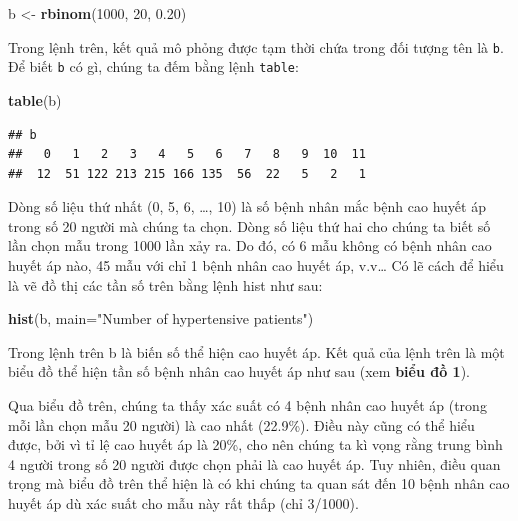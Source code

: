 \documentclass[
]{book}
\newenvironment{Shaded}{\begin{snugshade}}{\end{snugshade}}
\newcommand{\DataTypeTok}[1]{\textcolor[rgb]{0.13,0.29,0.53}{#1}}
\newcommand{\DecValTok}[1]{\textcolor[rgb]{0.00,0.00,0.81}{#1}}
\newcommand{\FloatTok}[1]{\textcolor[rgb]{0.00,0.00,0.81}{#1}}
\newcommand{\KeywordTok}[1]{\textcolor[rgb]{0.13,0.29,0.53}{\textbf{#1}}}
\newcommand{\NormalTok}[1]{#1}
\newcommand{\StringTok}[1]{\textcolor[rgb]{0.31,0.60,0.02}{#1}}
\begin{document}
\begin{Shaded}
\begin{Highlighting}[]
\NormalTok{b \textless{}{-}}\StringTok{ }\KeywordTok{rbinom}\NormalTok{(}\DecValTok{1000}\NormalTok{, }\DecValTok{20}\NormalTok{, }\FloatTok{0.20}\NormalTok{)}
\end{Highlighting}
\end{Shaded}

Trong lệnh trên, kết quả mô phỏng được tạm thời chứa trong đối tượng tên là \texttt{b}. Để biết \texttt{b} có gì, chúng ta đếm bằng lệnh \texttt{table}:

\begin{Shaded}
\begin{Highlighting}[]
\KeywordTok{table}\NormalTok{(b)}
\end{Highlighting}
\end{Shaded}

\begin{verbatim}
## b
##   0   1   2   3   4   5   6   7   8   9  10  11 
##  12  51 122 213 215 166 135  56  22   5   2   1
\end{verbatim}

Dòng số liệu thứ nhất (0, 5, 6, \ldots, 10) là số bệnh nhân mắc bệnh cao huyết áp trong số 20 người mà chúng ta chọn. Dòng số liệu thứ hai cho chúng ta biết số lần chọn mẫu trong 1000 lần xảy ra. Do đó, có 6 mẫu không có bệnh nhân cao huyết áp nào, 45 mẫu với chỉ 1 bệnh nhân cao huyết áp, v.v\ldots{} Có lẽ cách để hiểu là vẽ đồ thị các tần số trên bằng lệnh hist như sau:

\begin{Shaded}
\begin{Highlighting}[]
\KeywordTok{hist}\NormalTok{(b, }\DataTypeTok{main=}\StringTok{"Number of hypertensive patients"}\NormalTok{)}
\end{Highlighting}
\end{Shaded}

Trong lệnh trên b là biến số thể hiện cao huyết áp. Kết quả của lệnh trên là một biểu đồ thể hiện tần số bệnh nhân cao huyết áp như sau (xem \textbf{biểu đồ 1}).

Qua biểu đồ trên, chúng ta thấy xác suất có 4 bệnh nhân cao huyết áp (trong mỗi lần chọn mẫu 20 người) là cao nhất (22.9\%). Điều này cũng có thể hiểu được, bởi vì tỉ lệ cao huyết áp là 20\%, cho nên chúng ta kì vọng rằng trung bình 4 người trong số 20 người được chọn phải là cao huyết áp. Tuy nhiên, điều quan trọng mà biểu đồ trên thể hiện là có khi chúng ta quan sát đến 10 bệnh nhân cao huyết áp dù xác suất cho mẫu này rất thấp (chỉ 3/1000).
\end{document}
